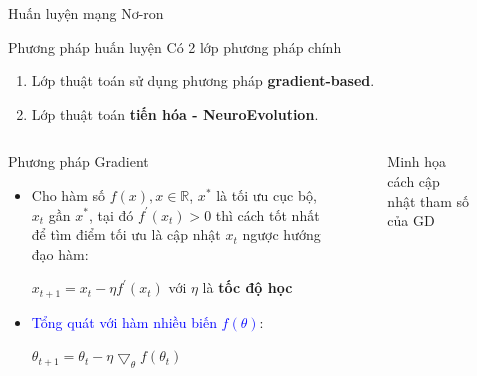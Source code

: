 	\begin{frame}{Huấn luyện mạng Nơ-ron}
	    \begin{itemize}
	    \begin{block}{Phương pháp huấn luyện}
        		    Có 2 lớp phương pháp chính
		    \begin{enumerate}
		        \setlength\itemsep{0.01em}
		        \item Lớp thuật toán sử dụng phương pháp \textbf{gradient-based}.
		        \item Lớp thuật toán \textbf{tiến hóa - NeuroEvolution}.
		    \end{enumerate}
		\end{block}
		\end{itemize}
        \begin{columns}
    		\begin{itemize}
        		\begin{block}{Phương pháp Gradient}
        		    \begin{itemize}
        		    \item Cho hàm số $f(x), x\in \mathbb{R}$, $x^*$ là tối ưu cục bộ, $x_t$ gần $x^*$, tại đó $f^{'}(x_t) > 0$ thì cách tốt nhất để tìm điểm tối ưu là cập nhật $x_t$ ngược hướng đạo hàm:
        		    \begin{center}
        		        $x_{t+1}=x_t - \eta f^'(x_t)$ với $\eta$ là \textbf{tốc độ học}
        		    \end{center}
        		    \item \textcolor{blue}{Tổng quát với hàm nhiều biến $f(\theta)$}:
        		    \begin{center}
                         $\theta_{t+1} = \theta_t - \eta \bigtriangledown_\theta f(\theta_t)$
                    \end{center}\\
                    \end{itemize}
        		\end{block}
        	\end{itemize}
        	    \begin{figure}[ht]
                    \centering
                    \caption{Minh họa cách cập nhật tham số của GD}
                    \label{fig:gd}
                \end{figure}
        \end{columns}
	\end{frame}
